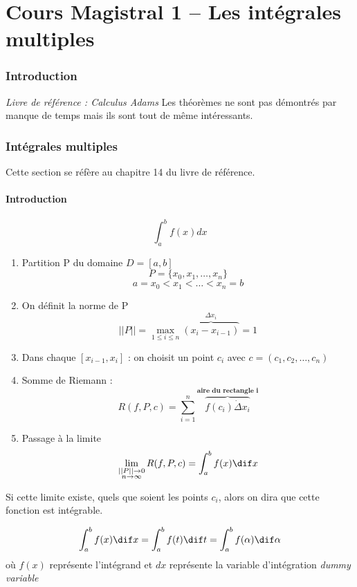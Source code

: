 \part{Cours Magistral 1 -- Les intégrales multiples}
\section*{Introduction}
\emph{Livre de référence : Calculus Adams}
Les théorèmes ne sont pas démontrés par manque de temps mais ils sont tout de même intéressants.
\section{Intégrales multiples}

Cette section se réfère au chapitre 14 du livre de référence.
\subsection{Introduction}
\[\int_{a}^{b} {f(x) dx}\]


\begin{enumerate}

\item Partition P du domaine $D=[a,b]$
$$ P = \{x_0,x_1,\dots,x_n\}$$
$$a=x_0<x_1<\dots<x_n=b$$
\item On définit la norme de P
$$||P|| = \underset{1\le i \le n}{\max} \overbrace{(x_i-x_{i-1})}^{\Delta x_i}=1$$

\item Dans chaque $[{x_{i-1},x_i}]$ : on choisit un point $c_i$ avec $c=(c_1,c_2,\dots,c_n)$

\item  Somme de Riemann : $$R(f,P,c)=\sum_{i=1}^{n} \overbrace{f(c_i)\dot \Delta  x_i}^{\textbf{aire du rectangle i}} $$

\item Passage à la limite $$\lim\limits_{\substack{||P|| \to 0 \\ n \to \infty}} R(f,P,c) =\int_{a}^{b} {f(x) \dif x}$$

\end{enumerate}
Si cette limite existe, quels que soient les points $c_i$, alors on dira que cette fonction est intégrable.
\begin{myrem}
$$\int_{a}^{b} {f(x) \dif x} = \int_{a}^{b} {f(t) \dif t} = \int_{a}^{b} {f(\alpha) \dif \alpha}$$ où $f(x)$ représente l'intégrand et $dx$ représente la variable d'intégration \textit{\og dummy variable \fg{}}
\end{myrem}

